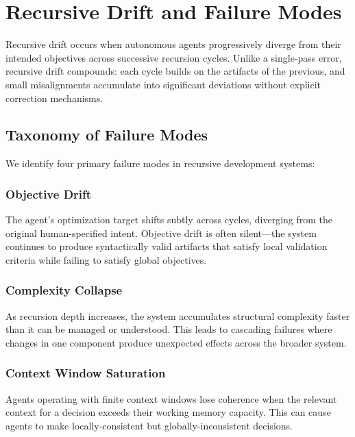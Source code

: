 \section{Recursive Drift and Failure Modes}
\label{sec:drift-failure-modes}

%

Recursive drift occurs when autonomous agents progressively diverge from their intended
objectives across successive recursion cycles. Unlike a single-pass error, recursive drift
compounds: each cycle builds on the artifacts of the previous, and small misalignments
accumulate into significant deviations without explicit correction mechanisms.

\subsection{Taxonomy of Failure Modes}

We identify four primary failure modes in recursive development systems:

\subsubsection{Objective Drift}
The agent's optimization target shifts subtly across cycles, diverging from the
original human-specified intent. Objective drift is often silent—the system continues
to produce syntactically valid artifacts that satisfy local validation criteria while
failing to satisfy global objectives.

\subsubsection{Complexity Collapse}
As recursion depth increases, the system accumulates structural complexity faster than
it can be managed or understood. This leads to cascading failures where changes in one
component produce unexpected effects across the broader system.

\subsubsection{Context Window Saturation}
Agents operating with finite context windows lose coherence when the relevant context
for a decision exceeds their working memory capacity. This can cause agents to make
locally-consistent but globally-inconsistent decisions.

